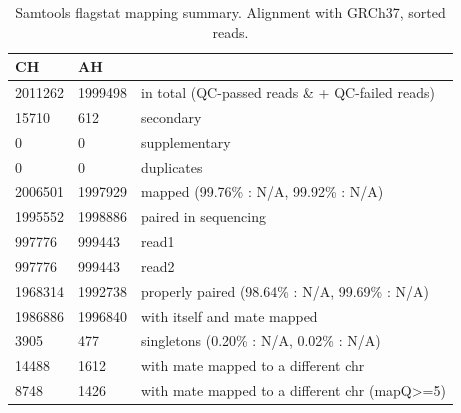 \documentclass{article}
\begin{document}
\begin{center}	
\begin{table}[!b]
\caption{Samtools flagstat mapping summary. Alignment with GRCh37, sorted reads.}			
\begin{tabular}{ l l l } 				
 \hline				
CH	 & 	AH 	 & 	 \\
 \hline				
2011262	 & 	1999498	 & 	in total (QC-passed reads \& + QC-failed reads) \\ 
15710	 & 	612	 & 	secondary \\ 
0	 & 	0	 & 	supplementary \\ 
0	 & 	0	 & 	duplicates \\ 
2006501	 & 	1997929	 & 	mapped (99.76\% : N/A, 99.92\% : N/A) \\ 
1995552	 & 	1998886	 & 	paired in sequencing \\ 
997776	 & 	999443	 & 	read1 \\ 
997776	 & 	999443	 & 	read2 \\ 
1968314	 & 	1992738	 & 	properly paired (98.64\% : N/A, 99.69\% : N/A) \\ 
1986886	 & 	1996840	 & 	with itself and mate mapped \\ 
3905	 & 	477	 & 	singletons (0.20\% : N/A, 0.02\% : N/A) \\ 
14488	 & 	1612	 & 	with mate mapped to a different chr \\ 
8748	 & 	1426	 & 	with mate mapped to a different chr (mapQ>=5) \\ 
\hline				
\end{tabular}				
\label{table:1}
\end{table}
\end{center}	
\end{document}
